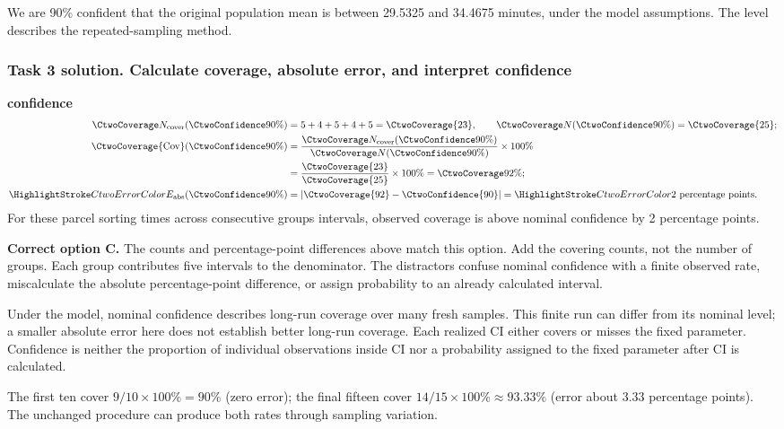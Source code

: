We are 90\% confident that the original population mean is between 29.5325 and 34.4675 minutes, under the model assumptions. The level describes the repeated-sampling method.
\par\vspace{3mm}
\clearpage
\subsubsection*{Task 3 solution. Calculate coverage, absolute error, and interpret confidence}
\label{sol:c2-advanced-c-c}
\textbf{ confidence}\nopagebreak[4]
\begin{align*}
\CtwoCoverCount(\CtwoConfidence{90\%})&=5+4+5+4+5=\CtwoCoverage{23},
\qquad\CtwoTotalCount(\CtwoConfidence{90\%})=\CtwoCoverage{25};\\
\CtwoCoverage{\mathrm{Cov}}(\CtwoConfidence{90\%})
&=\frac{\CtwoCoverCount(\CtwoConfidence{90\%})}{\CtwoTotalCount(\CtwoConfidence{90\%})}\times100\%
\\
&=\frac{\CtwoCoverage{23}}{\CtwoCoverage{25}}\times100\%=\CtwoCoverage{92\%};\\
\CtwoError{E_{\rm abs}}(\CtwoConfidence{90\%})
&=\left|\CtwoCoverage{92}-\CtwoConfidence{90}\right|=\CtwoError{2}\ \text{percentage points}.
\end{align*}
For these parcel sorting times across consecutive groups intervals, observed coverage is above nominal confidence by 2 percentage points.

\textbf{Correct option C.} The counts and percentage-point differences above match this option. Add the covering counts, not the number of groups. Each group contributes five intervals to the denominator. The distractors confuse nominal confidence with a finite observed rate, miscalculate the absolute percentage-point difference, or assign probability to an already calculated interval.

Under the model, nominal confidence describes long-run coverage over many fresh samples. This finite run can differ from its nominal level; a smaller absolute error here does not establish better long-run coverage. Each realized $\mathrm{CI}$ either covers or misses the fixed parameter. Confidence is neither the proportion of individual observations inside $\mathrm{CI}$ nor a probability assigned to the fixed parameter after $\mathrm{CI}$ is calculated.

The first ten cover $9/10\times100\%=90\%$ (zero error); the final fifteen cover $14/15\times100\%\approx93.33\%$ (error about 3.33 percentage points). The unchanged procedure can produce both rates through sampling variation.
\par\nopagebreak[4]
\par\vspace{3mm}
\clearpage
